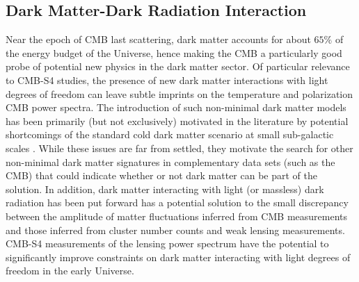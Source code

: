 \subsection{Dark Matter-Dark Radiation Interaction}
%
Near the epoch of CMB last scattering, dark matter accounts for about $65\%$ of the energy budget of the Universe, hence making the CMB a particularly good probe of potential new physics in the dark matter sector. Of particular relevance to CMB-S4 studies, the presence of new dark matter interactions with light degrees of freedom \cite{Goldberg:1986nk,1992ApJ...398...43C,1992ApJ...398..407G,1994ApJ...431...41M,1995ApJ...452..495D,AtrioBarandela:1996ur,Boehm:2001hm,Foot:2004pa,Green:2005fa,Profumo:2006bv,Mangano:2006mp,Ackerman:2008gi,ArkaniHamed:2008qn,Feng:2009mn,Serra:2009uu,Bringmann:2009vf,Kaplan:2009de,McDermott:2010pa,Kaplan:2011yj,Aarssen:2012fx,Diamanti:2012tg,Baldi:2012ua,Cline:2012is,Cyr-Racine:2013ab,Fan:2013yva,Fan:2013tia,Cyr-Racine:2013fsa,Bringmann:2013vra,Wilkinson:2013kia,Dvorkin:2013cea,Boehm:2014vja,Wilkinson:2014ksa,Escudero:2015yka,Chu:2014lja,Archidiacono:2014nda,Buen-Abad:2015ova,Lesgourgues:2015wza} can leave subtle imprints on the temperature and polarization CMB power spectra. The introduction of such non-minimal dark matter models has been primarily (but not exclusively) motivated in the literature by potential shortcomings of the standard cold dark matter scenario at small sub-galactic scales \cite{deBlok:1997zlw,Klypin:1999uc,Moore:1999aa,Zavala:2009ms,Oh:2010ea,BoylanKolchin:2011de,Papastergis:2011xe,Walker:2011zu,Pawlowski01112013,Klypin:2014ira,Oman:2015xda,Papastergis2015de}. While these issues are far from settled, they motivate the search for other non-minimal dark matter signatures in complementary data sets (such as the CMB) that could indicate whether or not dark matter can be part of the solution. In addition, dark matter interacting with light (or massless) dark radiation  has been put forward \cite{Buen-Abad:2015ova,Lesgourgues:2015wza} has a potential solution to the small discrepancy between the amplitude of matter fluctuations inferred from CMB measurements and those inferred from cluster number counts and weak lensing measurements. CMB-S4 measurements of the lensing power spectrum have the potential to significantly improve constraints on dark matter interacting with light degrees of freedom in the early Universe.

